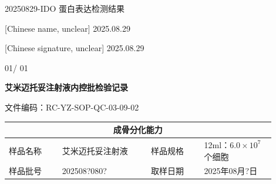 \documentclass[UTF8,10pt,a4paper,fontset=fandol]{ctexart}
\newcommand{\fieldvalue}[1]{#1}
\newcommand{\handwritten}[1]{#1}
\begin{document}
\newpage

\begin{center}
20250829-IDO 蛋白表达检测结果
\end{center}

\begin{figure}[ht]
\centering
\end{figure}

\begin{flushright}
\handwritten{[Chinese name, unclear]}\quad
\handwritten{2025.08.29}

\vspace{0.5em}

\handwritten{[Chinese signature, unclear]}\quad
\handwritten{2025.08.29}

\vspace{0.5em}

\handwritten{01}\quad/\quad
\handwritten{01}
\end{flushright}

\newpage

\begin{center}
\textbf{艾米迈托妥注射液内控批检验记录}
\end{center}

\noindent
文件编码：RC-YZ-SOP-QC-03-09-02

\begin{center}
\begin{tabular}{|p{0.18\linewidth}|p{0.30\linewidth}|p{0.18\linewidth}|p{0.24\linewidth}|}
\hline
\multicolumn{4}{|c|}{成骨分化能力} \\
\hline
样品名称 &
\fieldvalue{艾米迈托妥注射液} &
样品规格 &
\fieldvalue{12ml：$6.0\times10^{7}$个细胞} \\
\hline
样品批号 &
\fieldvalue{\handwritten{202508?080?}} &
取样日期 &
\fieldvalue{\handwritten{2025年08月?日}} \\
\hline
\end{tabular}
\end{center}
\end{document}
